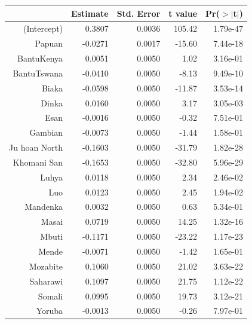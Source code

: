 \begin{table}[ht]
  \centering
  \begin{tabular}{rrrrr}
    \hline
   & Estimate & Std. Error & t value & Pr($>$$|$t$|$) \\ 
    \hline
  (Intercept) & 0.3807 & 0.0036 & 105.42 & 1.79e-47 \\ 
    Papuan & -0.0271 & 0.0017 & -15.60 & 7.44e-18 \\ 
    BantuKenya & 0.0051 & 0.0050 & 1.02 & 3.16e-01 \\ 
    BantuTswana & -0.0410 & 0.0050 & -8.13 & 9.49e-10 \\ 
    Biaka & -0.0598 & 0.0050 & -11.87 & 3.53e-14 \\ 
    Dinka & 0.0160 & 0.0050 & 3.17 & 3.05e-03 \\ 
    Esan & -0.0016 & 0.0050 & -0.32 & 7.51e-01 \\ 
    Gambian & -0.0073 & 0.0050 & -1.44 & 1.58e-01 \\ 
    Ju hoan North & -0.1603 & 0.0050 & -31.79 & 1.82e-28 \\ 
    Khomani San & -0.1653 & 0.0050 & -32.80 & 5.96e-29 \\ 
    Luhya & 0.0118 & 0.0050 & 2.34 & 2.46e-02 \\ 
    Luo & 0.0123 & 0.0050 & 2.45 & 1.94e-02 \\ 
    Mandenka & 0.0032 & 0.0050 & 0.63 & 5.34e-01 \\ 
    Masai & 0.0719 & 0.0050 & 14.25 & 1.32e-16 \\ 
    Mbuti & -0.1171 & 0.0050 & -23.22 & 1.17e-23 \\ 
    Mende & -0.0071 & 0.0050 & -1.42 & 1.65e-01 \\ 
    Mozabite & 0.1060 & 0.0050 & 21.02 & 3.63e-22 \\ 
    Saharawi & 0.1097 & 0.0050 & 21.75 & 1.12e-22 \\ 
    Somali & 0.0995 & 0.0050 & 19.73 & 3.12e-21 \\ 
    Yoruba & -0.0013 & 0.0050 & -0.26 & 7.97e-01 \\ 
     \hline
  \end{tabular}
  \label{table:sgdp:papuan_imf}
  \end{table}
  
